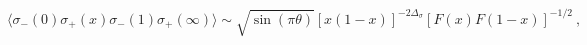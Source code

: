 \begin{equation}
\langle \sigma_- (0) \sigma_+ (x) \sigma_- (1)
\sigma_+ (\infty) \rangle \sim \sqrt{\sin (\pi \theta)}
[ x (1-x)]^{-2 \Delta_\sigma} [F(x) F(1-x)]^{-1/2}
\ ,
\end{equation}

